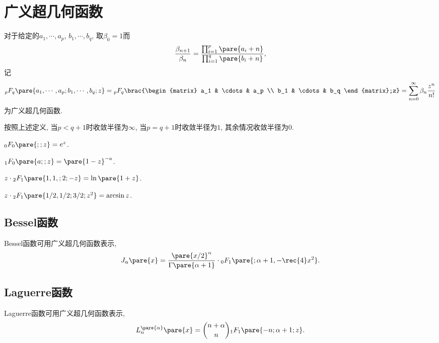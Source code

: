 \documentclass{ctexart}
\begin{document}
\section{广义超几何函数} %
\label{sec:广义超几何函数}

对于给定的$a_1,\cdots,a_p$, $b_1,\cdots,b_q$, 取$\beta_0 = 1$而
\[ \frac{\beta_{n+1}}{\beta_n} = \frac{\prod_{i=1}^p \pare{a_i + n}}{\prod_{i=1}^q\pare{b_i + n}}, \]
记
\[ {_pF_q} \pare{a_1,\cdots,a_p;b_1,\cdots,b_q;z} = {_pF_q}\brac{\begin{matrix}
    a_1 & \cdots & a_p \\
    b_1 & \cdots & b_q
\end{matrix};z} = \sum_{n=0}^\infty \beta_n \frac{z^n}{n!} \]
为广义超几何函数.
\begin{remark}
    按照上述定义, 当$p < q+1$时收敛半径为$\infty$, 当$p=q+1$时收敛半径为$1$, 其余情况收敛半径为$0$.
\end{remark}
\begin{ex}
    ${_0F_0}\pare{;;z} = e^z$.
\end{ex}
\begin{ex}
    ${_1F_0}\pare{a;;z} = \pare{1-z}^{-a}$.
\end{ex}
\begin{ex}
    $z\cdot{_2F_1}\pare{1,1,;2;-z} = \ln\pare{1+z}$.
\end{ex}
\begin{ex}
    $z\cdot{_2F_1}\pare{1/2,1/2;3/2;z^2} = \arcsin z$.
\end{ex}

\subsection{Bessel函数} %
\label{sub:bessel函数}

Bessel函数可用广义超几何函数表示,
\[ J_\alpha\pare{x} = \frac{\pare{x/2}^\alpha}{\Gamma\pare{\alpha+1}}\cdot{_0F_1}\pare{;\alpha+1,-\rec{4}x^2}. \]


\subsection{Laguerre函数} %
\label{sub:laguerre函数}

Laguerre函数可用广义超几何函数表示,
\[ L_n^{\pare{\alpha}}\pare{x} = \binom{n+\alpha}{n}{_1F_1}\pare{-n;\alpha+1;z}. \]

\end{document}
